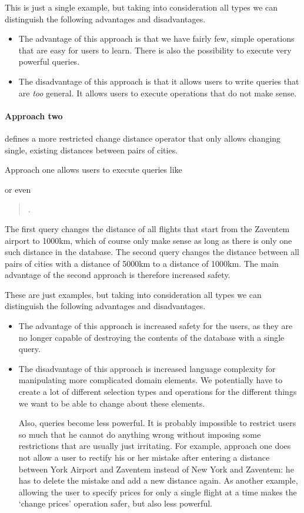 This is just a single example, but taking into consideration all types we can
distinguish the following advantages and disadvantages.
\begin{itemize}
  \item The advantage of this approach is that we have fairly few, simple
    operations that are easy for users to learn. There is also the possibility
    to execute very powerful queries.
  \item The disadvantage of this approach is that it allows users to write
    queries that are \emph{too} general. It allows users to execute
    operations that do not make sense.
\end{itemize}

\paragraph{Approach two}
defines a more restricted change distance operator that only allows changing
single, existing distances between pairs of cities.

Approach one allows users to execute queries like
\begin{quote}
\end{quote}
or even
\begin{quote}
  .
\end{quote}
The first query changes the distance of all flights that start from the Zaventem
airport to 1000km, which of course only make sense as long as there is only one
such distance in the database. The second query changes the distance between all
pairs of cities with a distance of 5000km to a distance of 1000km. The main
advantage of the second approach is therefore increased safety.

These are just examples, but taking into consideration all types we can
distinguish the following advantages and disadvantages.
\begin{itemize}
  \item The advantage of this approach is increased safety for the users, as
    they are no longer capable of destroying the contents of the database with a
    single query.
  \item The disadvantage of this approach is increased language complexity
    for manipulating more complicated domain elements. We potentially
    have to create a lot of different selection types and operations for the
    different things we want to be able to change about these elements.

    Also, queries become less powerful. It is probably impossible to restrict
    users so much that he cannot do anything wrong without imposing some
    restrictions that are usually just irritating. For example, approach one
    does not allow a user to rectify his or her mistake after entering a distance
    between York Airport and Zaventem instead of New York and Zaventem: he has
    to delete the mistake and add a new distance again. As another example,
    allowing the user to specify prices for only a single flight at a time makes
    the ‘change prices’ operation safer, but also less powerful.
\end{itemize}

